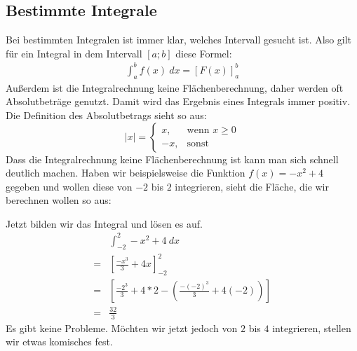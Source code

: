 \subsection{Bestimmte Integrale}
\begin{flushleft}
    Bei bestimmten Integralen ist immer klar, welches Intervall gesucht ist.
    Also gilt für ein Integral in dem Intervall $[a;b]$ diese Formel:
    \begin{align}
        \int_{a}^{b} f(x) \ dx = [F(x)]_{a}^{b}
    \end{align}
    Außerdem ist die Integralrechnung keine Flächenberechnung, daher werden oft Absolutbeträge genutzt. Damit wird das Ergebnis eines Integrals immer positiv.
    Die Definition des Absolutbetrags sieht so aus:
    \[
        \left | x \right | =
        \begin{cases}
            x, &\text{wenn } x \geq 0 \\
            -x, &\text{sonst}
        \end{cases}
    \]
    Dass die Integralrechnung keine Flächenberechnung ist kann man sich schnell deutlich machen.
    Haben wir beispielsweise die Funktion $f(x)=-x^2+4$ gegeben und wollen diese von $-2$ bis $2$ integrieren, sieht die Fläche, die wir berechnen wollen so aus:
\end{flushleft}

\begin{center}
\end{center}

\begin{flushleft}
    Jetzt bilden wir das Integral und lösen es auf.
    \begin{align}
        &\int_{-2}^{2} -x^2+4 \ dx \\
        = &\left[\frac{-x^3}{3}+4x\right]_{-2}^{2} \\
        = &\left[\frac{-2^3}{3}+4*2-\left(\frac{-(-2)^3}{3}+4(-2)\right)\right] \\
        = &\frac{32}{3}
    \end{align}
    Es gibt keine Probleme. Möchten wir jetzt jedoch von $2$ bis $4$ integrieren, stellen wir etwas komisches fest.
\end{flushleft}

